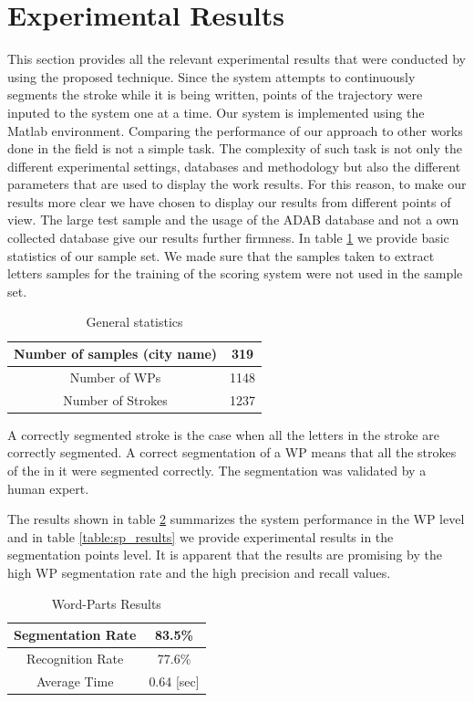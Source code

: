 \documentclass[journal,compsoc]{IEEEtran}
\begin{document}
\section{Experimental Results}
\label{sec:results}
This section provides all the relevant experimental results that were conducted by using the proposed technique. Since the system attempts to continuously segments the stroke while it is being written, points of the trajectory were inputed to the system one at a time. Our system is implemented using the Matlab environment. Comparing the performance of our approach to other works done in the field is not a simple task. The complexity of such task is not only the different experimental settings, databases and methodology but also the different parameters that are used to display the work results. For this reason,  to make our results more clear we have chosen to display our results from different points of view. The large test sample and the usage of the ADAB database and not a own collected database give our results further firmness. In table \ref{table:general_stats} we provide basic statistics of our sample set. We made sure that the samples taken to extract letters samples for the training of the scoring system were not used in the sample set.

\begin{table}[h]
\caption{General statistics}
\begin{tabular}{ | c | c | }
  \hline
  Number of samples (city name) & 319 \\
  \hline
  Number of WPs & 1148 \\
  \hline
  Number of Strokes & 1237 \\
  \hline
\end{tabular}
\centering
\label{table:general_stats} 
\end{table}

A correctly segmented stroke is the case when all the letters in the stroke are correctly segmented. A correct segmentation of a WP means that all the strokes of the in it were segmented correctly. The segmentation was validated by a human expert.

The results shown in table \ref{table:wp_results} summarizes the system performance in the WP level and in table \ref{table:sp_results} we provide experimental results in the segmentation points level. It is apparent that the results are promising by the high WP segmentation rate and the high precision and recall values.

\begin{table}[h]
\caption{Word-Parts Results}
\begin{tabular}{ | c | c | }
  \hline
  Segmentation Rate &  83.5\% \\ 
 \hline
  Recognition Rate &  77.6\% \\ 
 \hline
  Average Time & 0.64 [sec] \\
\hline
\end{tabular}
\centering
\label{table:wp_results} 
\end{table}
\end{document}
